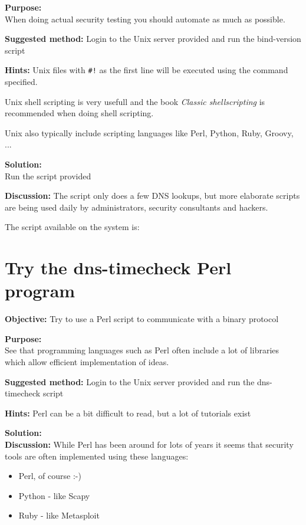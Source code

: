 \documentclass[a4paper,11pt,notitlepage]{report}
\begin{document}
{\bf Purpose:}\\
When doing actual security testing you should automate as much as possible.

{\bf Suggested method:}
Login to the Unix server provided and run the bind-version script

{\bf Hints:}
Unix files with \verb+#!+ as the first line will be executed using the command specified.

Unix shell scripting is very usefull and the book
\emph{Classic shellscripting} is recommended when doing shell scripting.

Unix also typically include scripting languages like Perl, Python, Ruby, Groovy, ...

{\bf Solution:}\\
Run the script provided

{\bf Discussion:}
The script only does a few DNS lookups, but more elaborate scripts are being used daily by administrators, security consultants and hackers.

The script available on the system is:
{\small
{}
}


\chapter{Try the dns-timecheck Perl program}
\label{ex:dns-timecheck}

{\bf Objective:}
Try to use a Perl script to communicate with a binary protocol

{\bf Purpose:}\\
See that programming languages such as Perl often include a lot of libraries which allow efficient implementation of ideas.

{\bf Suggested method:}
Login to the Unix server provided and run the dns-timecheck script

{\bf Hints:}
Perl can be a bit difficult to read, but a lot of tutorials exist

{\bf Solution:}\\

{\bf Discussion:}
While Perl has been around for lots of years it seems that security tools are often implemented using these languages:
\begin{itemize}
\item Perl, of course :-)
\item Python - like Scapy
\item Ruby - like Metasploit
\end{itemize}
\end{document}

